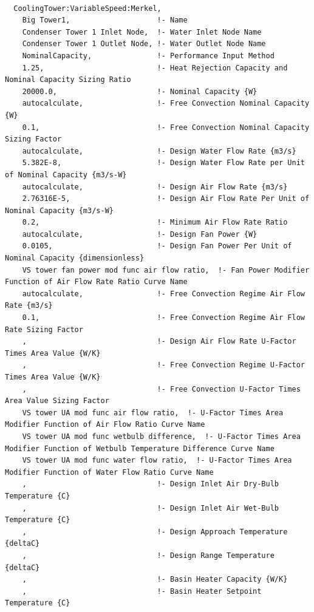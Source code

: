 \begin{lstlisting}

  CoolingTower:VariableSpeed:Merkel,
    Big Tower1,                    !- Name
    Condenser Tower 1 Inlet Node,  !- Water Inlet Node Name
    Condenser Tower 1 Outlet Node, !- Water Outlet Node Name
    NominalCapacity,               !- Performance Input Method
    1.25,                          !- Heat Rejection Capacity and Nominal Capacity Sizing Ratio
    20000.0,                       !- Nominal Capacity {W}
    autocalculate,                 !- Free Convection Nominal Capacity {W}
    0.1,                           !- Free Convection Nominal Capacity Sizing Factor
    autocalculate,                 !- Design Water Flow Rate {m3/s}
    5.382E-8,                      !- Design Water Flow Rate per Unit of Nominal Capacity {m3/s-W}
    autocalculate,                 !- Design Air Flow Rate {m3/s}
    2.76316E-5,                    !- Design Air Flow Rate Per Unit of Nominal Capacity {m3/s-W}
    0.2,                           !- Minimum Air Flow Rate Ratio
    autocalculate,                 !- Design Fan Power {W}
    0.0105,                        !- Design Fan Power Per Unit of Nominal Capacity {dimensionless}
    VS tower fan power mod func air flow ratio,  !- Fan Power Modifier Function of Air Flow Rate Ratio Curve Name
    autocalculate,                 !- Free Convection Regime Air Flow Rate {m3/s}
    0.1,                           !- Free Convection Regime Air Flow Rate Sizing Factor
    ,                              !- Design Air Flow Rate U-Factor Times Area Value {W/K}
    ,                              !- Free Convection Regime U-Factor Times Area Value {W/K}
    ,                              !- Free Convection U-Factor Times Area Value Sizing Factor
    VS tower UA mod func air flow ratio,  !- U-Factor Times Area Modifier Function of Air Flow Ratio Curve Name
    VS tower UA mod func wetbulb difference,  !- U-Factor Times Area Modifier Function of Wetbulb Temperature Difference Curve Name
    VS tower UA mod func water flow ratio,  !- U-Factor Times Area Modifier Function of Water Flow Ratio Curve Name
    ,                              !- Design Inlet Air Dry-Bulb Temperature {C}
    ,                              !- Design Inlet Air Wet-Bulb Temperature {C}
    ,                              !- Design Approach Temperature {deltaC}
    ,                              !- Design Range Temperature {deltaC}
    ,                              !- Basin Heater Capacity {W/K}
    ,                              !- Basin Heater Setpoint Temperature {C}

\end{lstlisting}
